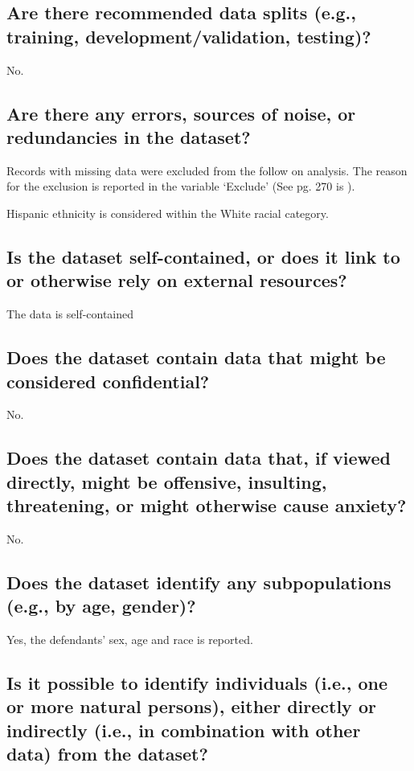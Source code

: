 \documentclass[letterpaper, 10 pt, conference]{ieeeconf}  %
\begin{document}
\subsection{Are there recommended data splits (e.g., training, development/validation, testing)?}

No.

\subsection{Are there any errors, sources of noise, or redundancies in the dataset?}

Records with missing data were excluded from the follow on analysis. The reason for the exclusion is reported in the variable `Exclude' (See pg. 270 is \cite{codebook}).

Hispanic ethnicity is considered within the White racial category.


\subsection{Is the dataset self-contained, or does it link to or otherwise rely on external resources?}

The data is self-contained

\subsection{Does the dataset contain data that might be considered confidential?}

No.

\subsection{Does the dataset contain data that, if viewed directly, might be offensive, insulting, threatening, or might otherwise cause anxiety?}

No.

\subsection{Does the dataset identify any subpopulations (e.g., by age, gender)?}

Yes, the defendants' sex, age and race is reported. 

\subsection{Is it possible to identify individuals (i.e., one or more natural persons), either directly or indirectly (i.e., in combination with other data) from the dataset?}
\end{document}
